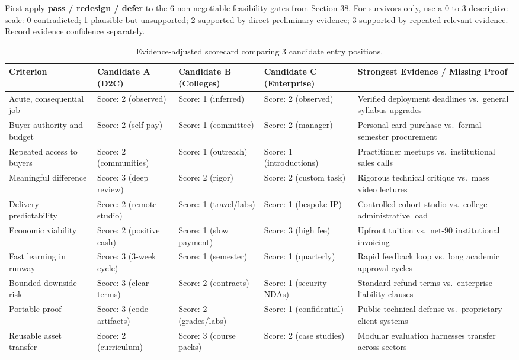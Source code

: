 First apply \textbf{pass / redesign / defer} to the 6 non-negotiable feasibility gates from Section 38. For survivors only, use a 0 to 3 descriptive scale: 0 contradicted; 1 plausible but unsupported; 2 supported by direct preliminary evidence; 3 supported by repeated relevant evidence. Record evidence confidence separately.

\begin{table}[t]
\centering
\small
\begin{tabularx}{\textwidth}{l p{2.6cm} p{2.6cm} p{2.6cm} X}
\toprule
\textbf{Criterion} & \textbf{Candidate A (D2C)} & \textbf{Candidate B (Colleges)} & \textbf{Candidate C (Enterprise)} & \textbf{Strongest Evidence / Missing Proof} \\
\midrule
Acute, consequential job & Score: 2 (observed) & Score: 1 (inferred) & Score: 2 (observed) & Verified deployment deadlines vs.\ general syllabus upgrades \\
Buyer authority and budget & Score: 2 (self-pay) & Score: 1 (committee) & Score: 2 (manager) & Personal card purchase vs.\ formal semester procurement \\
Repeated access to buyers & Score: 2 (communities) & Score: 1 (outreach) & Score: 1 (introductions) & Practitioner meetups vs.\ institutional sales calls \\
Meaningful difference & Score: 3 (deep review) & Score: 2 (rigor) & Score: 2 (custom task) & Rigorous technical critique vs.\ mass video lectures \\
Delivery predictability & Score: 2 (remote studio) & Score: 1 (travel/labs) & Score: 1 (bespoke IP) & Controlled cohort studio vs.\ college administrative load \\
Economic viability & Score: 2 (positive cash) & Score: 1 (slow payment) & Score: 3 (high fee) & Upfront tuition vs.\ net-90 institutional invoicing \\
Fast learning in runway & Score: 3 (3-week cycle) & Score: 1 (semester) & Score: 1 (quarterly) & Rapid feedback loop vs.\ long academic approval cycles \\
Bounded downside risk & Score: 3 (clear terms) & Score: 2 (contracts) & Score: 1 (security NDAs) & Standard refund terms vs.\ enterprise liability clauses \\
Portable proof & Score: 3 (code artifacts) & Score: 2 (grades/labs) & Score: 1 (confidential) & Public technical defense vs.\ proprietary client systems \\
Reusable asset transfer & Score: 2 (curriculum) & Score: 3 (course packs) & Score: 2 (case studies) & Modular evaluation harnesses transfer across sectors \\
\bottomrule
\end{tabularx}
\caption{Evidence-adjusted scorecard comparing 3 candidate entry positions.}
\label{tab:ch7-scorecard}
\end{table}

